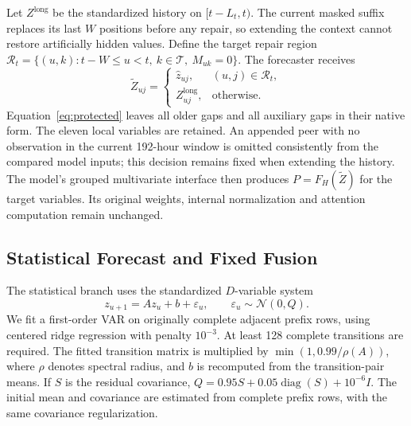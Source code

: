 Let $Z^{\mathrm{long}}$ be the standardized history on $[t-L_t,t)$. The current masked suffix replaces its last $W$ positions before any repair, so extending the context cannot restore artificially hidden values. Define the target repair region $\mathcal R_t=\{(u,k):t-W\leq u<t,\ k\in\mathcal T,\ M_{uk}=0\}$. The forecaster receives
\begin{equation}
 \widetilde Z_{uj}=\begin{cases}
 \widehat z_{uj}, & (u,j)\in\mathcal R_t,\\
 Z^{\mathrm{long}}_{uj}, & \text{otherwise}.
 \end{cases}
 \label{eq:protected}
\end{equation}
Equation~\ref{eq:protected} leaves all older gaps and all auxiliary gaps in their native form. The eleven local variables are retained. An appended peer with no observation in the current 192-hour window is omitted consistently from the compared model inputs; this decision remains fixed when extending the history. The model's grouped multivariate interface then produces $P=F_H(\widetilde Z)$ for the target variables. Its original weights, internal normalization and attention computation remain unchanged.

\subsection{Statistical Forecast and Fixed Fusion}

The statistical branch uses the standardized $D$-variable system
\begin{equation}
 z_{u+1}=Az_u+b+\varepsilon_u,\qquad \varepsilon_u\sim\mathcal N(0,Q).
 \label{eq:var}
\end{equation}
We fit a first-order VAR on originally complete adjacent prefix rows, using centered ridge regression with penalty $10^{-3}$. At least 128 complete transitions are required. The fitted transition matrix is multiplied by $\min(1,0.99/\rho(A))$, where $\rho$ denotes spectral radius, and $b$ is recomputed from the transition-pair means. If $S$ is the residual covariance, $Q=0.95S+0.05\operatorname{diag}(S)+10^{-6}I$. The initial mean and covariance are estimated from complete prefix rows, with the same covariance regularization.

